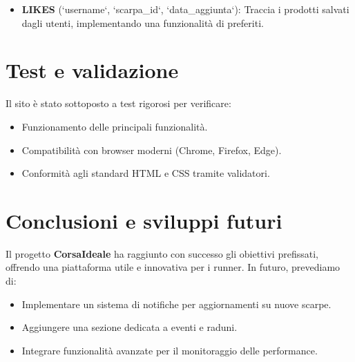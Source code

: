 \documentclass[a4paper, 12pt]{article}
\begin{document}
\begin{justify}
\begin{itemize}
\item \textbf{LIKES} (`username`, `scarpa\_id`, `data\_aggiunta`): Traccia i prodotti salvati dagli utenti, implementando una funzionalità di preferiti.
\end{itemize}


\section{Test e validazione}
Il sito è stato sottoposto a test rigorosi per verificare:
\begin{itemize}
    \item Funzionamento delle principali funzionalità.
    \item Compatibilit\`a con browser moderni (Chrome, Firefox, Edge).
    \item Conformit\`a agli standard HTML e CSS tramite validatori.
\end{itemize}

\section{Conclusioni e sviluppi futuri}
Il progetto \textbf{CorsaIdeale} ha raggiunto con successo gli obiettivi prefissati, offrendo una piattaforma utile e innovativa per i runner. In futuro, prevediamo di:
\begin{itemize}
    \item Implementare un sistema di notifiche per aggiornamenti su nuove scarpe.
    \item Aggiungere una sezione dedicata a eventi e raduni.
    \item Integrare funzionalit\`a avanzate per il monitoraggio delle performance.
\end{itemize}

\vspace{1cm}


\end{justify}
\end{document}
